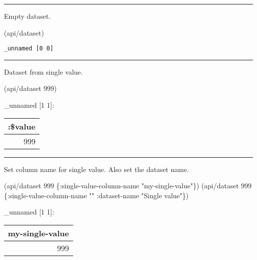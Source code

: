 \documentclass[]{article}
\newenvironment{Shaded}{\begin{snugshade}}{\end{snugshade}}
\newcommand{\DecValTok}[1]{\textcolor[rgb]{0.00,0.00,0.81}{#1}}
\newcommand{\StringTok}[1]{\textcolor[rgb]{0.31,0.60,0.02}{#1}}
\newcommand{\AttributeTok}[1]{\textcolor[rgb]{0.77,0.63,0.00}{#1}}
\newcommand{\NormalTok}[1]{#1}
\begin{document}
\begin{center}\rule{0.5\linewidth}{0.5pt}\end{center}

Empty dataset.

\begin{Shaded}
\begin{Highlighting}[]
\NormalTok{(api/dataset)}
\end{Highlighting}
\end{Shaded}

\begin{verbatim}
_unnamed [0 0]
\end{verbatim}

\begin{center}\rule{0.5\linewidth}{0.5pt}\end{center}

Dataset from single value.

\begin{Shaded}
\begin{Highlighting}[]
\NormalTok{(api/dataset }\DecValTok{999}\NormalTok{)}
\end{Highlighting}
\end{Shaded}

\_unnamed {[}1 1{]}:

\begin{longtable}[]{@{}r@{}}
\toprule
:\$value\tabularnewline
\midrule
\endhead
999\tabularnewline
\bottomrule
\end{longtable}

\begin{center}\rule{0.5\linewidth}{0.5pt}\end{center}

Set column name for single value. Also set the dataset name.

\begin{Shaded}
\begin{Highlighting}[]
\NormalTok{(api/dataset }\DecValTok{999}\NormalTok{ \{}\AttributeTok{:single-value-column-name} \StringTok{"my-single-value"}\NormalTok{\})}
\NormalTok{(api/dataset }\DecValTok{999}\NormalTok{ \{}\AttributeTok{:single-value-column-name} \StringTok{""}
                  \AttributeTok{:dataset-name} \StringTok{"Single value"}\NormalTok{\})}
\end{Highlighting}
\end{Shaded}

\_unnamed {[}1 1{]}:

\begin{longtable}[]{@{}r@{}}
\toprule
my-single-value\tabularnewline
\midrule
\endhead
999\tabularnewline
\bottomrule
\end{longtable}
\end{document}
